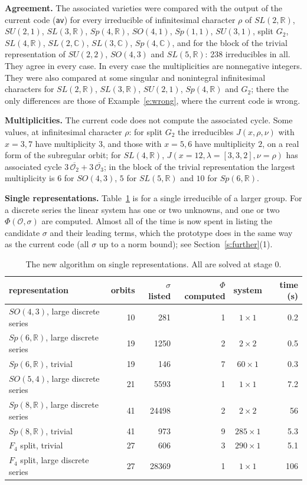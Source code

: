 \documentclass[11pt,leqno]{article}
\theoremstyle{definition}
\numberwithin{equation}{section}
\newcommand{\Ob}{\mathcal O}
\newcommand{\R}{\mathbb R}
\newcommand{\C}{\mathbb C}
\newcommand{\at}[1]{\texttt{#1}}
\newcommand{\mi}{\medskip\noindent}
\begin{document}
\mi\textbf{Agreement.}  The associated varieties were compared with the output
of the current code (\at{av}) for every irreducible of infinitesimal
character $\rho$ of $SL(2,\R)$, $SU(2,1)$, $SL(3,\R)$, $Sp(4,\R)$, $SO(4,1)$,
$Sp(1,1)$, $SU(3,1)$, split $G_2$, $SL(4,\R)$, $SL(2,\C)$, $SL(3,\C)$,
$Sp(4,\C)$, and for the block of the trivial representation of $SU(2,2)$,
$SO(4,3)$ and $SL(5,\R)$: 238 irreducibles in all.  They agree in
every case.  In every case the multiplicities are nonnegative integers.  They
were also compared at some singular and nonintegral infinitesimal characters
for $SL(2,\R)$, $SL(3,\R)$, $SU(2,1)$, $Sp(4,\R)$ and $G_2$; there the only
differences are those of Example~\ref{e:wrong}, where the current code is
wrong.

\mi\textbf{Multiplicities.}  The current code does not compute the associated
cycle.  Some values, at infinitesimal character $\rho$: for split $G_2$ the
irreducibles $J(x,\rho,\nu)$ with $x=3,7$ have multiplicity $3$, and those
with $x=5,6$ have multiplicity $2$, on a real form of the subregular orbit;
for $SL(4,\R)$, $J(x=12,\lambda=[3,3,2],\nu=\rho)$ has associated cycle
$3\,\overline{\Ob_2}+3\,\overline{\Ob_3}$; in the block of the trivial
representation the largest multiplicity is $6$ for $SO(4,3)$, $5$ for
$SL(5,\R)$ and $10$ for $Sp(6,\R)$.

\mi\textbf{Single representations.}  Table~\ref{tab:single} is for a single
irreducible of a larger group.  For a discrete series the linear system has
one or two unknowns, and one or two $\Phi(\Ob,\sigma)$ are computed.  Almost
all of the time is now spent in listing the candidate $\sigma$ and their
leading terms, which the prototype does in the same way as the current code
(all $\sigma$ up to a norm bound); see Section~\ref{s:further}(1).

\begin{table}[ht]
\centering
\begin{tabular}{lrrrcr}
\toprule
representation & orbits & $\sigma$ listed & $\Phi$ computed & system & time (s)\\
\midrule
$SO(4,3)$, large discrete series & 10 & 281 & 1 & $1\times 1$ & 0.2\\
$Sp(6,\R)$, large discrete series & 19 & 1250 & 2 & $2\times 2$ & 0.5\\
$Sp(6,\R)$, trivial & 19 & 146 & 7 & $60\times 1$ & 0.3\\
$SO(5,4)$, large discrete series & 21 & 5593 & 1 & $1\times 1$ & 7.2\\
$Sp(8,\R)$, large discrete series & 41 & 24498 & 2 & $2\times 2$ & 56\\
$Sp(8,\R)$, trivial & 41 & 973 & 9 & $285\times 1$ & 5.3\\
$F_4$ split, trivial & 27 & 606 & 3 & $290\times 1$ & 5.1\\
$F_4$ split, large discrete series & 27 & 28369 & 1 & $1\times 1$ & 106\\
\bottomrule
\end{tabular}
\caption{The new algorithm on single representations.  All are solved at
stage 0.}
\label{tab:single}
\end{table}
\end{document}
